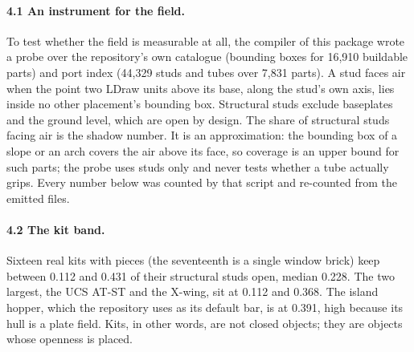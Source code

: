 \documentclass[11pt,a4paper]{article}
\begin{document}
\paragraph{4.1 An instrument for the field.} To test whether the field is measurable at all, the compiler of this package wrote a probe over the repository's own catalogue (bounding boxes for 16,910 buildable parts) and port index (44,329 studs and tubes over 7,831 parts). A stud faces air when the point two LDraw units above its base, along the stud's own axis, lies inside no other placement's bounding box. Structural studs exclude baseplates and the ground level, which are open by design. The share of structural studs facing air is the shadow number. It is an approximation: the bounding box of a slope or an arch covers the air above its face, so coverage is an upper bound for such parts; the probe uses studs only and never tests whether a tube actually grips. Every number below was counted by that script and re-counted from the emitted files.

\paragraph{4.2 The kit band.} Sixteen real kits with pieces (the seventeenth is a single window brick) keep between 0.112 and 0.431 of their structural studs open, median 0.228. The two largest, the UCS AT-ST and the X-wing, sit at 0.112 and 0.368. The island hopper, which the repository uses as its default bar, is at 0.391, high because its hull is a plate field. Kits, in other words, are not closed objects; they are objects whose openness is placed.
\end{document}

